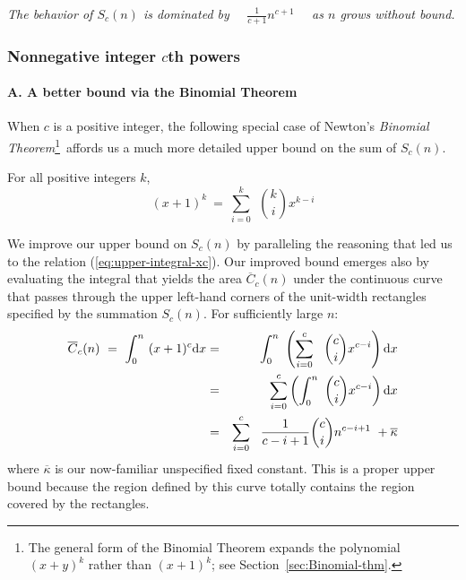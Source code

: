 \smallskip

\begin{center}
{\em The behavior of $S_c(n)$ is dominated by \ \
  $\displaystyle \frac{1}{c+1} n^{c+1}$ \ \ as $n$ grows without bound.  }
\end{center}

\subsubsection{Nonnegative integer $c$th powers}
\label{sec:positive-integer-power}

\paragraph{A. A better bound via the Binomial Theorem}

When $c$ is a positive integer, the following special case of Newton's {\it Binomial Theorem}\footnote{The general form of the Binomial Theorem expands the polynomial $(x+y)^k$ rather than $(x+1)^k$; see Section~\ref{sec:Binomial-thm}.}~affords us a much more detailed upper bound on the sum of $S_c(n)$.

\begin{theorem}
\label{thm:restricted-binomial-thm}
For all positive integers $k$,
\begin{equation}
\label{eq:restricted-binomial-thm}
(x+1)^k \ = \ \sum_{i=0}^k \ \ {k \choose i} x^{k-i}
\end{equation}
\end{theorem}

We improve our upper bound on $S_c(n)$ by paralleling the reasoning that led us to the relation (\ref{eq:upper-integral-xc}).  Our improved bound emerges also by evaluating the integral that
yields the area $\overline{C}_c(n)$ under the continuous curve that passes through the upper left-hand corners of the unit-width rectangles specified by the summation $S_c(n)$.  For sufficiently large $n$:
\begin{eqnarray}
\label{eq:upper-integral-xk}
\overline{C}_c(n) \ = \
\int_0^n \ (x+1)^c {\rm d}x & = &
\int_0^n \ \left(\sum_{i=0}^c \ \ {c \choose i} x^{c-i} \right) {\rm d}x \\
\nonumber
& = &
\sum_{i=0}^c \left( \int_0^n \  {c \choose i} x^{c-i} \right) {\rm d}x \\
\nonumber
  & = &
\sum_{i=0}^c \ \ \frac{1}{c-i+1} {c \choose i} n^{c-i+1} \ + \overline{\kappa}
\end{eqnarray}
where $\overline{\kappa}$ is our now-familiar unspecified fixed constant.  This is a proper upper bound because the region defined by this curve totally contains the region covered by the rectangles.

